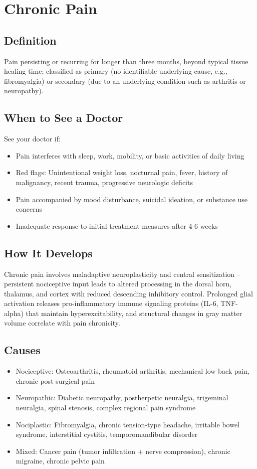 \chapter{Chronic Pain}

\section*{Definition}
Pain persisting or recurring for longer than three months, beyond typical tissue healing time; classified as primary (no identifiable underlying cause, e.g., fibromyalgia) or secondary (due to an underlying condition such as arthritis or neuropathy).

\section*{When to See a Doctor}
See your doctor if:
\begin{itemize}
  \item Pain interferes with sleep, work, mobility, or basic activities of daily living
  \item Red flags: Unintentional weight loss, nocturnal pain, fever, history of malignancy, recent trauma, progressive neurologic deficits
  \item Pain accompanied by mood disturbance, suicidal ideation, or substance use concerns
  \item Inadequate response to initial treatment measures after 4-6 weeks
\end{itemize}

\section*{How It Develops}
Chronic pain involves maladaptive neuroplasticity and central sensitization -- persistent nociceptive input leads to altered processing in the dorsal horn, thalamus, and cortex with reduced descending inhibitory control. Prolonged glial activation releases pro-inflammatory immune signaling proteins (IL-6, TNF-alpha) that maintain hyperexcitability, and structural changes in gray matter volume correlate with pain chronicity.

\section*{Causes}
\begin{itemize}
  \item Nociceptive: Osteoarthritis, rheumatoid arthritis, mechanical low back pain, chronic post-surgical pain
  \item Neuropathic: Diabetic neuropathy, postherpetic neuralgia, trigeminal neuralgia, spinal stenosis, complex regional pain syndrome
  \item Nociplastic: Fibromyalgia, chronic tension-type headache, irritable bowel syndrome, interstitial cystitis, temporomandibular disorder
  \item Mixed: Cancer pain (tumor infiltration + nerve compression), chronic migraine, chronic pelvic pain
\end{itemize}

